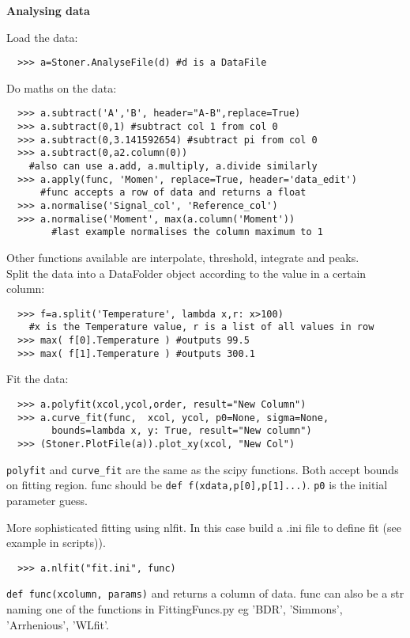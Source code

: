 \documentclass[a4paper,9pt,threecolumn,landscape]{scrartcl}
\begin{document}
\begin{multicols}{2}
\vspace{0.2cm}
\textbf {Analysing data}
\vspace{0.2cm}\normalfont

Load the data:
\begin{verbatim}
  >>> a=Stoner.AnalyseFile(d) #d is a DataFile
\end{verbatim}
Do maths on the data:
\begin{verbatim}
  >>> a.subtract('A','B', header="A-B",replace=True)
  >>> a.subtract(0,1) #subtract col 1 from col 0
  >>> a.subtract(0,3.141592654) #subtract pi from col 0
  >>> a.subtract(0,a2.column(0))
    #also can use a.add, a.multiply, a.divide similarly
  >>> a.apply(func, 'Momen', replace=True, header='data_edit')
      #func accepts a row of data and returns a float 
  >>> a.normalise('Signal_col', 'Reference_col')
  >>> a.normalise('Moment', max(a.column('Moment'))
  		#last example normalises the column maximum to 1
\end{verbatim}
Other functions available are interpolate, threshold, integrate and peaks.\\

Split the data into a DataFolder object according to the value in a certain column:
\begin{verbatim}
  >>> f=a.split('Temperature', lambda x,r: x>100)
  	#x is the Temperature value, r is a list of all values in row
  >>> max( f[0].Temperature ) #outputs 99.5
  >>> max( f[1].Temperature ) #outputs 300.1
\end{verbatim} 
Fit the data:
\begin{verbatim}
  >>> a.polyfit(xcol,ycol,order, result="New Column")
  >>> a.curve_fit(func,  xcol, ycol, p0=None, sigma=None,
        bounds=lambda x, y: True, result="New column")
  >>> (Stoner.PlotFile(a)).plot_xy(xcol, "New Col")
\end{verbatim}
\verb+polyfit+ and \verb+curve_fit+ are the same as the scipy functions. Both accept bounds on fitting region. func should be \verb+def f(xdata,p[0],p[1]...)+.
\verb+p0+ is the initial parameter guess.

More sophisticated fitting using nlfit. In this case build a .ini file to define fit (see example in scripts)).
\begin{verbatim}
  >>> a.nlfit("fit.ini", func)
\end{verbatim}
\verb+def func(xcolumn, params)+ and returns a column of data.
func can also be a str naming one of the functions in FittingFuncs.py eg 'BDR', 'Simmons', 'Arrhenious', 'WLfit'.
 

\end{multicols}
\end{document}
